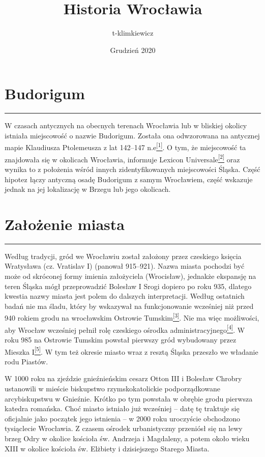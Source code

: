 \documentclass{article}
\title{Historia Wrocławia}
\author{t-klimkiewicz }
\date{Grudzień 2020}
\begin{document}
\maketitle
\tableofcontents

\section{Budorigum}
\noindent\rule{\textwidth}{0.4pt}

W czasach antycznych na obecnych terenach Wrocławia lub w bliskiej okolicy istniała miejscowość o nazwie Budorigum. Została ona odwzorowana na antycznej mapie Klaudiusza Ptolemeusza z lat 142–147 n.e\hyperlink{1}{\textsuperscript{[1]}}. O tym, że miejscowość ta znajdowała się w okolicach Wrocławia, informuje Lexicon Universale\hyperlink{2}{\textsuperscript{[2]}} oraz wynika to z położenia wśród innych zidentyfikowanych miejscowości Śląska. Część hipotez łączy antyczną osadę Budorigum z samym Wrocławiem, część wskazuje jednak na jej lokalizację w Brzegu lub jego okolicach.

\section{Założenie miasta}
\noindent\rule{\textwidth}{0.4pt}
Według tradycji, gród we Wrocławiu został założony przez czeskiego księcia Wratysława (cz. Vratislav I) (panował 915–921). Nazwa miasta pochodzi być może od skróconej formy imienia założyciela (Wrocisław), jednakże ekspansję na teren Śląska mógł przeprowadzić Bolesław I Srogi dopiero po roku 935, dlatego kwestia nazwy miasta jest polem do dalszych interpretacji. Według ostatnich badań nie ma śladu, który by wskazywał na funkcjonowanie wcześniej niż przed 940 rokiem grodu na wrocławskim Ostrowie Tumskim\hyperlink{3}{\textsuperscript{[3]}}. Nie ma więc możliwości, aby Wrocław wcześniej pełnił rolę czeskiego ośrodka administracyjnego\hyperlink{4}{\textsuperscript{[4]}}. W roku 985 na Ostrowie Tumskim powstał pierwszy gród wybudowany przez Mieszka I\hyperlink{5}{\textsuperscript{[5]}}. W tym też okresie miasto wraz z resztą Śląska przeszło we władanie rodu Piastów.

W 1000 roku na zjeździe gnieźnieńskim cesarz Otton III i Bolesław Chrobry ustanowili w mieście biskupstwo rzymskokatolickie podporządkowane arcybiskupstwu w Gnieźnie. Krótko po tym powstała w obrębie grodu pierwsza katedra romańska. Choć miasto istniało już wcześniej – datę tę traktuje się oficjalnie jako początek jego istnienia – w 2000 roku uroczyście obchodzono tysiąclecie Wrocławia. Z czasem ośrodek urbanistyczny przeniósł się na lewy brzeg Odry w okolice kościoła św. Andrzeja i Magdaleny, a potem około wieku XIII w okolice kościoła św. Elżbiety i dzisiejszego Starego Miasta.
\newpage
\end{document}
